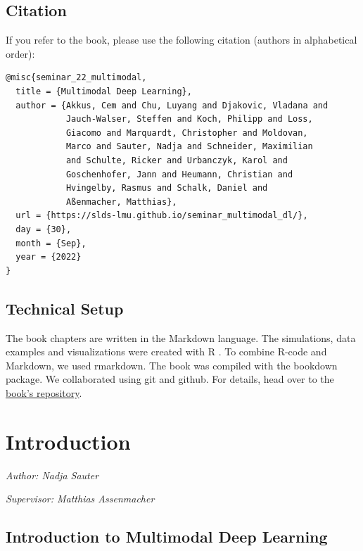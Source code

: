 \documentclass[
]{krantz}
\begin{document}
\hypertarget{citation}{%
\section*{Citation}\label{citation}}


If you refer to the book, please use the following citation (authors in alphabetical order):

\begin{verbatim}
@misc{seminar_22_multimodal,
  title = {Multimodal Deep Learning},
  author = {Akkus, Cem and Chu, Luyang and Djakovic, Vladana and
            Jauch-Walser, Steffen and Koch, Philipp and Loss,
            Giacomo and Marquardt, Christopher and Moldovan,
            Marco and Sauter, Nadja and Schneider, Maximilian
            and Schulte, Ricker and Urbanczyk, Karol and
            Goschenhofer, Jann and Heumann, Christian and
            Hvingelby, Rasmus and Schalk, Daniel and
            Aßenmacher, Matthias},
  url = {https://slds-lmu.github.io/seminar_multimodal_dl/},
  day = {30},
  month = {Sep},
  year = {2022}
}
\end{verbatim}

\hypertarget{technical-setup}{%
\section*{Technical Setup}\label{technical-setup}}


The book chapters are written in the Markdown language.
The simulations, data examples and visualizations were created with R \citep{rlang}.
To combine R-code and Markdown, we used rmarkdown.
The book was compiled with the bookdown package.
We collaborated using git and github.
For details, head over to the \href{https://github.com/slds-lmu/seminar_multimodal_dl}{book's repository}.

\hypertarget{introduction}{%
\chapter{Introduction}\label{introduction}}

\emph{Author: Nadja Sauter}

\emph{Supervisor: Matthias Assenmacher}

\hypertarget{introduction-to-multimodal-deep-learning}{%
\section{Introduction to Multimodal Deep Learning}\label{introduction-to-multimodal-deep-learning}}
\end{document}
